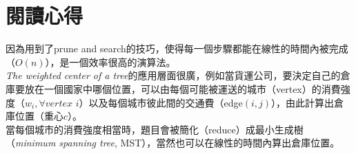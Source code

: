 \documentclass[15pt]{extarticle}
\begin{document}
\section{閱讀心得}
因為用到了prune and search的技巧，使得每一個步驟都能在線性的時間內被完成（$O(n)$），是一個效率很高的演算法。\\

\textit{The weighted center of a tree}的應用層面很廣，例如當貨運公司，要決定自己的倉庫要放在一個國家中哪個位置，可以由每個可能被運送的城市（vertex）的消費強度（$w_i,\forall vertex$ $i$）以及每個城市彼此間的交通費（edge$(i,j)$），由此計算出倉庫位置（重心$c$）。\\

當每個城市的消費強度相當時，題目會被簡化（reduce）成最小生成樹（\textit{minimum spanning tree}, MST），當然也可以在線性的時間內算出倉庫位置。
\end{document}
